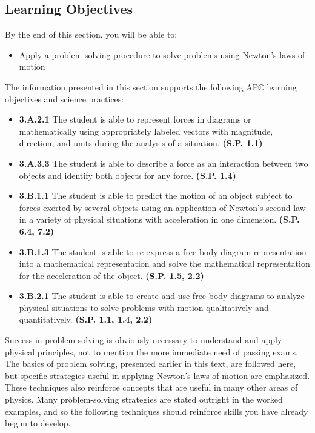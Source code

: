 \documentclass[
]{book}
\providecommand{\tightlist}{%
  \setlength{\itemsep}{0pt}\setlength{\parskip}{0pt}}
\newenvironment{learning-objectives}{}{}
\begin{document}
\hypertarget{fs-id1795639}{}
\begin{learning-objectives}

\hypertarget{learning-objectives-17}{%
\subsection{Learning Objectives}\label{learning-objectives-17}}

By the end of this section, you will be able to:

\begin{itemize}
\tightlist
\item
  Apply a problem-solving procedure to solve problems using Newton's
  laws of motion
\end{itemize}

The information presented in this section supports the following AP®
learning objectives and science practices:

\begin{itemize}
\tightlist
\item
  \textbf{3.A.2.1} The student is able to represent forces in diagrams or
  mathematically using appropriately labeled vectors with magnitude,
  direction, and units during the analysis of a situation. \textbf{(S.P.
  1.1)}
\item
  \textbf{3.A.3.3} The student is able to describe a force as an
  interaction between two objects and identify both objects for any
  force. \textbf{(S.P. 1.4)}
\item
  \textbf{3.B.1.1} The student is able to predict the motion of an object
  subject to forces exerted by several objects using an application of
  Newton's second law in a variety of physical situations with
  acceleration in one dimension. \textbf{(S.P. 6.4, 7.2)}
\item
  \textbf{3.B.1.3} The student is able to re-express a free-body diagram
  representation into a mathematical representation and solve the
  mathematical representation for the acceleration of the object.
  \textbf{(S.P. 1.5, 2.2)}
\item
  \textbf{3.B.2.1} The student is able to create and use free-body diagrams
  to analyze physical situations to solve problems with motion
  qualitatively and quantitatively. \textbf{(S.P. 1.1, 1.4, 2.2)}
\end{itemize}

\end{learning-objectives}

Success in problem solving is obviously necessary to understand and
apply physical principles, not to mention the more immediate need of
passing exams. The basics of problem solving, presented earlier in this
text, are followed here, but specific strategies useful in applying
Newton's laws of motion are emphasized. These techniques also reinforce
concepts that are useful in many other areas of physics. Many
problem-solving strategies are stated outright in the worked examples,
and so the following techniques should reinforce skills you have already
begun to develop.
\end{document}
